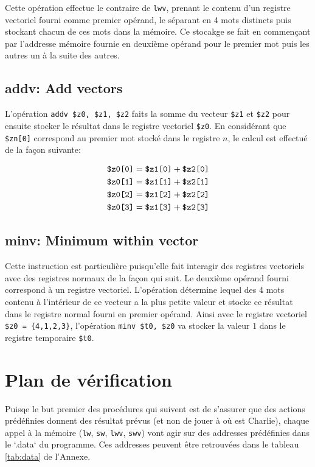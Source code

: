 \documentclass[a11paper]{article}
\newcommand{\vtt}[1]{%
  \text{\normalfont\ttfamily\detokenize{#1}}%
}
\begin{document}
Cette opération effectue le contraire de \verb|lwv|, prenant le contenu d'un
registre vectoriel fourni comme premier opérand, le séparant en 4 mots
distincts puis stockant chacun de ces mots dans la mémoire. Ce stocakge se fait
en commençant par l'addresse mémoire fournie en deuxième opérand pour le
premier mot puis les autres un à la suite des autres.

\subsection{addv: Add vectors}

L'opération \verb|addv $z0, $z1, $z2| faits la somme du vecteur \verb|$z1| et
\verb|$z2| pour ensuite stocker le résultat dans le registre vectoriel
\verb|$z0|. En considérant que \verb|$zn[0]| correspond au premier mot stocké
dans le registre $n$, le calcul est effectué de la façon suivante:

\begin{align}
  \vtt{$z0[0]} &= \vtt{$z1[0]} + \vtt{$z2[0]} \\
  \vtt{$z0[1]} &= \vtt{$z1[1]} + \vtt{$z2[1]} \\
  \vtt{$z0[2]} &= \vtt{$z1[2]} + \vtt{$z2[2]} \\
  \vtt{$z0[3]} &= \vtt{$z1[3]} + \vtt{$z2[3]}
\end{align}

\subsection{minv: Minimum within vector}

Cette instruction est particulière puisqu'elle fait interagir des registres
vectoriels avec des registres normaux de la façon qui suit. Le deuxième opérand
fourni correspond à un registre vectoriel. L'opération détermine lequel des 4
mots contenu à l'intérieur de ce vecteur a la plus petite valeur et stocke ce
résultat dans le registre normal fourni en premier opérand. Ainsi avec le
registre vectoriel \verb|$z0 = {4,1,2,3}|, l'opération \verb|minv $t0, $z0| va
stocker la valeur $1$ dans le registre temporaire \verb|$t0|.

\section{Plan de vérification}

Puisqe le but premier des procédures qui suivent est de s'assurer que des
actions prédéfinies donnent des résultat prévus (et non de jouer à où est
Charlie), chaque appel à la mémoire (\verb|lw|, \verb|sw|, \verb|lwv|,
\verb|swv|) vont agir sur des addresses prédéfinies dans le `.data` du
programme. Ces addresses peuvent être retrouvées dans le tableau \ref{tab:data}
de l'Annexe.
\end{document}
